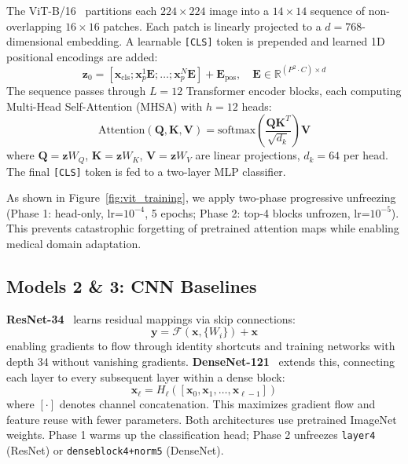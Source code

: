 \documentclass[conference]{IEEEtran}
\begin{document}
The ViT-B/16~\cite{b6} partitions each $224\times224$ image into a $14\times14$ sequence of non-overlapping $16\times16$ patches. Each patch is linearly projected to a $d=768$-dimensional embedding. A learnable \texttt{[CLS]} token is prepended and learned 1D positional encodings are added:
\begin{equation}
\mathbf{z}_0 = [\mathbf{x}_\text{cls}; \mathbf{x}^1_p\mathbf{E}; \ldots; \mathbf{x}^N_p\mathbf{E}] + \mathbf{E}_\text{pos}, \quad \mathbf{E} \in \mathbb{R}^{(P^2 \cdot C) \times d}
\end{equation}
The sequence passes through $L=12$ Transformer encoder blocks, each computing Multi-Head Self-Attention (MHSA) with $h=12$ heads:
\begin{equation}
\text{Attention}(\mathbf{Q},\mathbf{K},\mathbf{V}) = \text{softmax}\!\left(\frac{\mathbf{Q}\mathbf{K}^T}{\sqrt{d_k}}\right)\mathbf{V}
\label{eq:attn}
\end{equation}
where $\mathbf{Q} = \mathbf{z}W_Q$, $\mathbf{K} = \mathbf{z}W_K$, $\mathbf{V} = \mathbf{z}W_V$ are linear projections, $d_k=64$ per head. The final \texttt{[CLS]} token is fed to a two-layer MLP classifier.

As shown in Figure~\ref{fig:vit_training}, we apply two-phase progressive unfreezing (Phase 1: head-only, lr=$10^{-4}$, 5 epochs; Phase 2: top-4 blocks unfrozen, lr=$10^{-5}$). This prevents catastrophic forgetting of pretrained attention maps while enabling medical domain adaptation.

\subsection{Models 2 \& 3: CNN Baselines}
\textbf{ResNet-34}~\cite{b7} learns residual mappings via skip connections:
\begin{equation}
\mathbf{y} = \mathcal{F}(\mathbf{x}, \{W_i\}) + \mathbf{x}
\end{equation}
enabling gradients to flow through identity shortcuts and training networks with depth 34 without vanishing gradients. \textbf{DenseNet-121}~\cite{b8} extends this, connecting each layer to every subsequent layer within a dense block:
\begin{equation}
\mathbf{x}_\ell = H_\ell\!\left([\mathbf{x}_0, \mathbf{x}_1, \ldots, \mathbf{x}_{\ell-1}]\right)
\end{equation}
where $[\cdot]$ denotes channel concatenation. This maximizes gradient flow and feature reuse with fewer parameters. Both architectures use pretrained ImageNet weights. Phase 1 warms up the classification head; Phase 2 unfreezes \texttt{layer4} (ResNet) or \texttt{denseblock4+norm5} (DenseNet).
\end{document}
